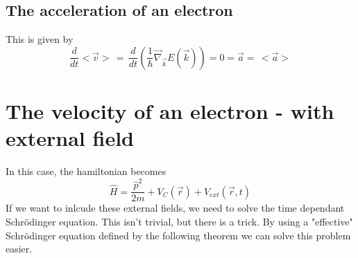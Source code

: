 \subsection{The acceleration of an electron}
This is given by
\begin{equation}
	\frac{d}{dt}<\vec{v}> \,= \,\frac{d}{dt}\left(\frac{1}{\hbar}\vec{\nabla}_{\vec{k}}E(\vec{k})\right) = 0 = \vec{a} =\, <\vec{a}>
\end{equation}

\section{The velocity of an electron - with external field} \label{sec:eff_mass_th}
In this case, the hamiltonian becomes
\begin{equation}
	\hat{H} = \frac{\hat{p}^2}{2m} + V_C(\vec{r}) + V_{ext}(\vec{r}, t) \label{eqn:hamiltonian_seq_velocity}
\end{equation}
If we want to inlcude these external fields, we need to solve the time dependant Schrödinger equation. This isn't trivial, but there is a trick. By using a "effective" Schrödinger equation defined by the following theorem we can solve this problem easier.
